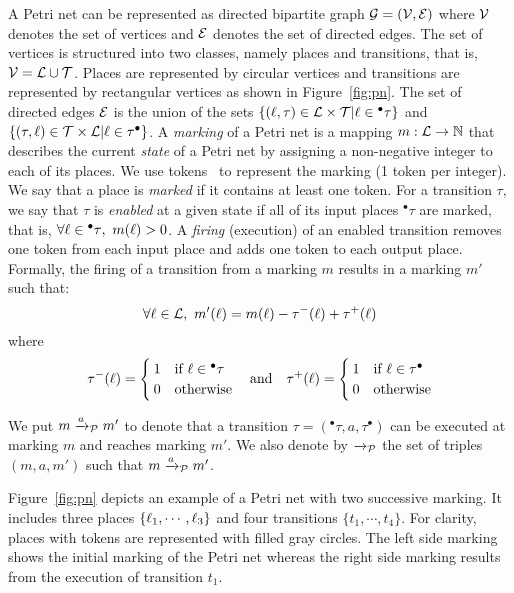 A Petri net can be represented as directed bipartite graph $\mathcal{G}=(\mathcal{V},\mathcal{E})$ where 
$\mathcal{V}$ denotes the set of vertices and $\mathcal{E}$ denotes the set of directed edges. 
The set of vertices is structured into two classes, namely places and transitions, 
that is, $\mathcal{V}=\mathcal{L}\cup\mathcal{T}$. 
Places are represented by circular vertices and transitions are represented by rectangular 
vertices as shown in Figure~\ref{fig:pn}. 
The set of directed edges $\mathcal{E}$ is the union of the sets $\{(\ell,\tau)\in\mathcal{L}\times\mathcal{T}|
\ell\in{^\bullet\tau}\}$ and $\{(\tau,\ell)\in\mathcal{T}\times\mathcal{L}|\ell\in\tau^\bullet\}$.
A \emph{marking} of a Petri net is a mapping $m:\mathcal{L}\to\mathbb{N}$ that describes the current
\emph{state} of a Petri net by assigning a non-negative integer to each of its places.
We use tokens~\cite{} to represent the marking (1 token per integer). We say that a place is
\emph{marked} if it contains at least one token.
For a transition $\tau$, we say that $\tau$ is \emph{enabled} at a given state if all of 
its input places $^\bullet\tau$ are marked, that is, $\forall\loc\in{^\bullet\tau},\ m(\loc)>0$.
A \emph{firing} (execution) of an enabled transition removes one token from each input place
and adds one token to each output place. Formally, the firing of a transition from a marking 
$m$ results in a marking $m'$ such that:
\begin{displaymath}
  \forall\loc\in\Loc, \ m'(\loc)=m(\loc)-\tau^{-}(\loc)+\tau^{+}(\loc) 
\end{displaymath}
where
\begin{displaymath}
  \tau^{-}(\ell)=\begin{cases}
    1 & \text{if }\ell\in{^\bullet\tau}\\
    0 & \text{otherwise} 
  \end{cases}
 \quad \text{and}\quad
\tau^{+}(\ell)=\begin{cases}
    1 & \text{if }\ell\in{\tau^\bullet }\\
    0 & \text{otherwise} 
\end{cases}\end{displaymath}

We put $m\xrightarrow{a}_{\mathcal{P}}m'$ to denote that a transition $\tau=({^\bullet\tau},a,
  \tau^\bullet)$ can be executed at marking $m$ and reaches marking $m'$. 
  We also denote by $\xrightarrow{}_{\mathcal{P}}$
the set of triples $(m,a,m')$ such that $m\xrightarrow{a}_{\mathcal{P}}m'$.
  
\begin{example}
  Figure~\ref{fig:pn} depicts an example of a Petri net with two successive marking. It includes
  three places $\{\ell_1,\cdots,\ell_3\}$ and four transitions $\{t_1,\cdots,t_4\}$. For clarity,
  places with tokens are represented with filled gray circles. The left side marking 
  shows the initial marking of the Petri net whereas the right side marking results from the
  execution of transition $t_1$.
\end{example}

